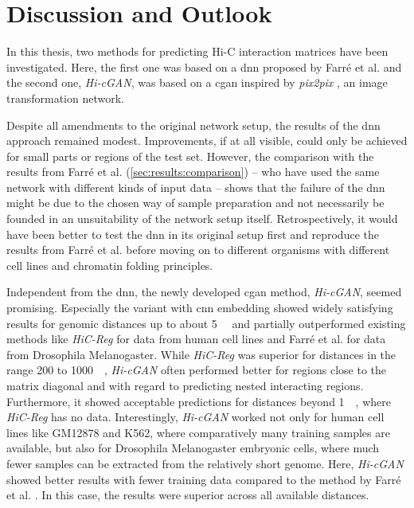 %
\section{Discussion and Outlook}
In this thesis, two methods for predicting Hi-C interaction matrices have been investigated.
Here, the first one was based on a \acrlong{dnn} proposed by Farr\'e et al. \cite{Farre2018a} and the second one, \emph{Hi-cGAN}, 
was based on a \acrlong{cgan} inspired by \emph{pix2pix} \cite{Isola2017}, an image transformation network.

Despite all amendments to the original network setup,
the results of the \acrlong{dnn} approach remained modest.
Improvements, if at all visible, could only be achieved for small parts or regions of the test set.
However, the comparison with the results from Farr\'e et al. \cite{Farre2018a} (\cref{sec:results:comparison}) -- who have used the same network with different kinds of input data --
shows that the failure of the \acrshort{dnn} might be due to the chosen way of sample preparation 
and not necessarily be founded in an unsuitability of the network setup itself.
Retrospectively, it would have been better to test the \acrshort{dnn} in its original setup first and reproduce the results from Farr\'e et al. \cite{Farre2018a} 
before moving on to different organisms with different cell lines and chromatin folding principles.

Independent from the \acrshort{dnn}, the newly developed \acrlong{cgan} method, \emph{Hi-cGAN}, seemed promising.
Especially the variant with \acrshort{cnn} embedding showed widely satisfying results for genomic distances up to about \SI{5}{\mega\bp}
and partially outperformed existing methods like \emph{HiC-Reg} \cite{Zhang2019} for data from human cell lines 
and Farré et al. \cite{Farre2018a} for data from Drosophila Melanogaster.
While \emph{HiC-Reg} was superior for distances in the range 200 to \SI{1000}{\kilo\bp}, \emph{Hi-cGAN} often performed better for regions close to the matrix diagonal
and with regard to predicting nested interacting regions. Furthermore, it showed acceptable predictions for distances beyond \SI{1}{\mega\bp}, where \emph{HiC-Reg} has no data.
Interestingly, \emph{Hi-cGAN} worked not only for human cell lines like GM12878 and K562, where comparatively many training samples are available,
but also for Drosophila Melanogaster embryonic cells, where much fewer samples can be extracted from the relatively short genome.
Here, \emph{Hi-cGAN} showed better results with fewer training data compared to the method by Farr\'e et al. \cite{Farre2018a}.
In this case, the results were superior across all available distances.

